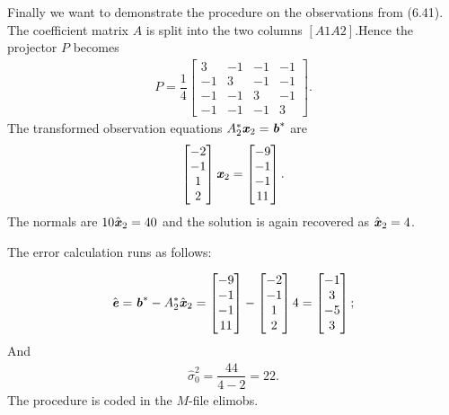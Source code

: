 Finally we want to demonstrate the procedure on the observations from (6.41). The coefficient matrix $A$ is split into the two columns $[A1 A2]$.Hence the projector $P$ becomes
\begin{align*}
P = \dfrac{1}{4}
\begin{bmatrix}
3 & -1 & -1 & -1 \\
-1 & 3 & -1 & -1 \\
-1 & -1 & 3 & -1 \\
-1 & -1 & -1 & 3 
\end{bmatrix}.
\end{align*}
The transformed observation equations $A^{*}_{2}\textbf{\textit{x}}_{2} = \textbf{\textit{b}}^{*} $ are
\begin{align*}
\begin{bmatrix}
-2 \\
 -1 \\
1 \\
2 
\end{bmatrix}
\textbf{\textit{x}}_{2}= 
\begin{bmatrix}
-9 \\
-1 \\
-1 \\
11 
\end{bmatrix}.
\end{align*}
The normals are $ 10\hat{\textbf{\textit{x}}}_{2} = 40$ and the solution is again recovered as $\hat{\textbf{\textit{x}}}_{2} = 4 $.

The error calculation runs as follows:

\begin{align*}
\hat{\textbf{\textit{e}}} = \textbf{\textit{b}}^{*} -A^{*}_{2} \hat{\textbf{\textit{x}}}_{2} =
\begin{bmatrix}
-9 \\
-1 \\
-1 \\
11 
\end{bmatrix} -
\begin{bmatrix}
-2 \\
-1 \\
1 \\
2 
\end{bmatrix}4 = 
\begin{bmatrix}
-1 \\
3 \\
-5 \\
3 
\end{bmatrix};
\end{align*}
And
\begin{align*}
\hat{\sigma}^{2}_{0} = \dfrac{44}{4-2} = 22 .
\end{align*}
The procedure is coded in the $M$-file elimobs.